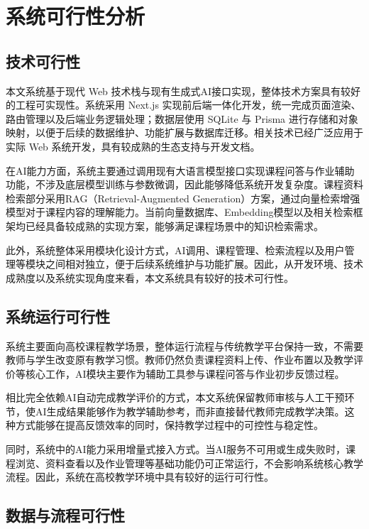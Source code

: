 \documentclass[12pt,a4paper,oneside]{ctexbook}
\numberwithin{equation}{chapter}
\begin{document}
\section{系统可行性分析}

\subsection{技术可行性}

本文系统基于现代 Web 技术栈与现有生成式AI接口实现，整体技术方案具有较好的工程可实现性。系统采用 Next.js 实现前后端一体化开发，统一完成页面渲染、路由管理以及后端业务逻辑处理；数据层使用 SQLite 与 Prisma 进行存储和对象映射，以便于后续的数据维护、功能扩展与数据库迁移。相关技术已经广泛应用于实际 Web 系统开发，具有较成熟的生态支持与开发文档。

在AI能力方面，系统主要通过调用现有大语言模型接口实现课程问答与作业辅助功能，不涉及底层模型训练与参数微调，因此能够降低系统开发复杂度。课程资料检索部分采用RAG（Retrieval-Augmented Generation）方案，通过向量检索增强模型对于课程内容的理解能力。当前向量数据库、Embedding模型以及相关检索框架均已经具备较成熟的实现方案，能够满足课程场景中的知识检索需求。

此外，系统整体采用模块化设计方式，AI调用、课程管理、检索流程以及用户管理等模块之间相对独立，便于后续系统维护与功能扩展。因此，从开发环境、技术成熟度以及系统实现角度来看，本文系统具有较好的技术可行性。

\subsection{系统运行可行性}

系统主要面向高校课程教学场景，整体运行流程与传统教学平台保持一致，不需要教师与学生改变原有教学习惯。教师仍然负责课程资料上传、作业布置以及教学评价等核心工作，AI模块主要作为辅助工具参与课程问答与作业初步反馈过程。

相比完全依赖AI自动完成教学评价的方式，本文系统保留教师审核与人工干预环节，使AI生成结果能够作为教学辅助参考，而非直接替代教师完成教学决策。这种方式能够在提高反馈效率的同时，保持教学过程中的可控性与稳定性。

同时，系统中的AI能力采用增量式接入方式。当AI服务不可用或生成失败时，课程浏览、资料查看以及作业管理等基础功能仍可正常运行，不会影响系统核心教学流程。因此，系统在高校教学环境中具有较好的运行可行性。

\subsection{数据与流程可行性}
\end{document}
